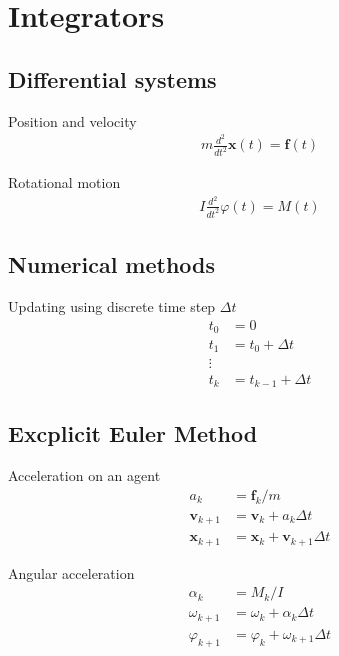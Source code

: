 \section{Integrators}
\subsection{Differential systems}
Position and velocity
\begin{align}
m \frac{d^{2}}{d t^{2}} \mathbf{x}(t) = \mathbf{f}(t)
\end{align}

Rotational motion
\begin{align}
I \frac{d^{2}}{d t^{2}} \varphi(t) = M(t)
\end{align}

\subsection{Numerical methods}
Updating using discrete time step $ \Delta t $
\begin{align}
t_{0} &= 0 \\
t_{1} &= t_{0} + \Delta t \\
\vdots \\
t_{k} &= t_{k-1} + \Delta t
\end{align}


\subsection{Excplicit Euler Method}
Acceleration on an agent
\begin{align}
a_{k} &= \mathbf{f}_{k} / m \\
\mathbf{v}_{k+1} &= \mathbf{v}_{k} + a_{k} \Delta t \\
\mathbf{x}_{k+1} &= \mathbf{x}_{k} + \mathbf{v}_{k+1} \Delta t
\end{align}


Angular acceleration
\begin{align}
\alpha_{k} &= M_{k} / I \\
\omega_{k+1} &= \omega_{k} + \alpha_{k} \Delta t \\
\varphi_{k+1} &= \varphi_{k} + \omega_{k+1} \Delta t
\end{align}



